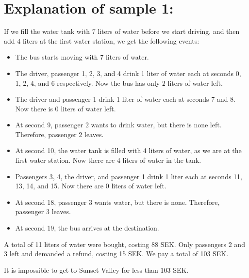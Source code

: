 \section*{Explanation of sample 1:}
If we fill the water tank with 7 liters of water before we start driving, and then add 4 liters at the first water station, we get the following events:

\begin{itemize}
  \item The bus starts moving with 7 liters of water.
  \item The driver, passenger 1, 2, 3, and 4 drink 1 liter of water each at seconds 0, 1, 2, 4, and 6 respectively. Now the bus has only 2 liters of water left.
  \item The driver and passenger 1 drink 1 liter of water each at seconds 7 and 8. Now there is 0 liters of water left.
  \item At second 9, passenger 2 wants to drink water, but there is none left. Therefore, passenger 2 leaves.
  \item At second 10, the water tank is filled with 4 liters of water, as we are at the first water station. Now there are 4 liters of water in the tank.
  \item Passengers 3, 4, the driver, and passenger 1 drink 1 liter each at seconds 11, 13, 14, and 15. Now there are 0 liters of water left.
  \item At second 18, passenger 3 wants water, but there is none. Therefore, passenger 3 leaves.
  \item At second 19, the bus arrives at the destination.
\end{itemize}

A total of 11 liters of water were bought, costing 88 SEK. Only passengers 2 and 3 left and demanded a refund, costing 15 SEK. We pay a total of 103 SEK.

It is impossible to get to Sunset Valley for less than 103 SEK.
